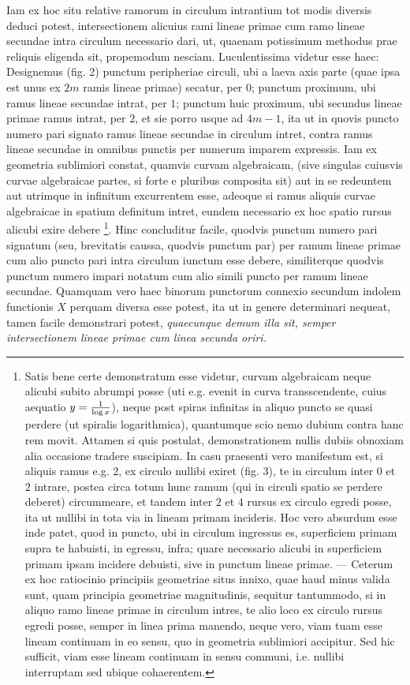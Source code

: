 \documentclass[twoside,12pt, showframe]{memoir}
\let\oldfrac\frac
\def\frac#1#2{\mathchoice{\tfrac{#1}{#2}}{\oldfrac{#1}{#2}}{\genfrac{}{}{}{2}{#1}{#2\mathstrut}}{\genfrac{}{}{}{3}{#1}{#2\mathstrut}}}
\begin{document}
Iam ex hoc situ relative ramorum in circulum intrantium tot modis diversis deduci potest, intersectionem alicuius rami lineae primae cum ramo lineae secundae intra circulum necessario dari, ut, quaenam potissimum methodus prae reliquis eligenda sit, propemodum nesciam. Luculentissima videtur esse haec: Designemus (fig. 2) punctum peripheriae circuli, ubi a laeva axis parte (quae ipsa est unus ex \(2m\) ramis lineae primae) secatur, per \(0\); punctum proximum, ubi ramus lineae secundae intrat, per \(1\); punctum huic proximum, ubi secundus lineae primae ramus intrat, per \(2\), et sie porro usque ad \(4m-1\), ita ut in quovis puncto numero pari signato ramus lineae secundae in circulum intret, contra ramus lineae secundae in omnibus punctis per numerum imparem expressis. Iam ex geometria sublimiori constat, quamvis curvam algebraicam, (sive singulas cuiusvis curvae algebraicae partes, si forte e pluribus composita sit) aut in se redeuntem aut utrimque in infinitum excurrentem esse, adeoque si ramus aliquis curvae algebraicae in spatium definitum intret, eundem necessario ex hoc spatio rursus alicubi exire debere \footnote{ Satis bene certe demonstratum esse videtur, curvam algebraicam neque alicubi subito abrumpi posse (uti e.g. evenit in curva transscendente, cuius aequatio \( y = \frac{1}{\log x} \)), neque post spiras infinitas in aliquo puncto se quasi perdere (ut spiralis logarithmica), quantumque scio nemo dubium contra hanc rem movit. Attamen si quis postulat, demonstrationem nullis dubiis obnoxiam alia occasione tradere suscipiam. In casu praesenti vero manifestum est, si aliquis ramus e.g. 2, ex circulo nullibi exiret (fig. 3), te in circulum inter \(0\) et \(2\) intrare, postea circa totum hunc ramum (qui in circuli spatio se perdere deberet) circummeare, et tandem inter \(2\) et \(4\) rursus ex circulo egredi posse, ita ut nullibi in tota via in lineam primam incideris.   Hoc vero absurdum esse inde patet,  quod in puncto, ubi in circulum ingressus es, superficiem primam supra te habuisti, in egressu, infra; quare necessario alicubi in superficiem primam ipsam incidere debuisti, sive in punctum lineae primae. — Ceterum ex hoc ratiocinio principiis geometriae situs innixo, quae haud minus valida sunt, quam principia geometriae magnitudinis, sequitur tantummodo, si in aliquo ramo lineae primae in circulum intres, te alio loco ex circulo rursus egredi posse, semper in linea prima manendo, neque vero, viam tuam esse lineam continuam in eo sensu, quo in geometria sublimiori accipitur. Sed hic sufficit, viam esse lineam continuam in sensu communi, i.e. nullibi interruptam sed ubique cohaerentem.}. Hinc concluditur facile, quodvis punctum numero pari signatum (seu, brevitatis caussa, quodvis punctum par) per ramum lineae primae cum alio puncto pari intra circulum iunctum esse debere, similiterque quodvis punctum numero impari notatum cum alio simili puncto per ramum lineae secundae.  Quamquam vero haec binorum punctorum connexio secundum indolem functionis \(X\) perquam diversa esse potest, ita ut in genere determinari nequeat, tamen facile demonstrari potest, \textit{quaecunque demum illa sit, semper intersectionem lineae primae cum linea secunda oriri.}
\end{document}
